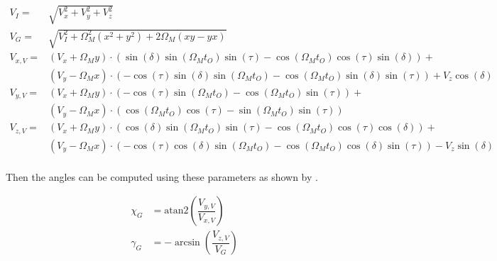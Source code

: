 \begin{equation} \label{eq:intermediateParameters}
\begin{split}
V_{I}=&\sqrt{V_{x}^{2}+V_{y}^{2}+V_{z}^{2}}\\
V_{G}=&\sqrt{V_{I}^{2}+\Omega_{M}^{2}\left(x^{2}+y^{2}\right)+2\Omega_{M}\left(xy-yx\right)}\\
V_{x,V}=&\left(V_{x}+\Omega_{M}y\right)\cdot \left(\sin\left(\delta\right)\sin\left(\Omega_{M}t_{O}\right)\sin\left(\tau\right)-\cos\left(\Omega_{M}t_{O}\right)\cos\left(\tau\right)\sin\left(\delta	\right)\right)+\\
&\left(V_{y}-\Omega_{M}x\right)\cdot \left(-\cos\left(\tau\right)\sin\left(\delta\right)\sin\left(\Omega_{M}t_{O}\right)-\cos\left(\Omega_{M}t_{O}\right)\sin\left(\delta\right)\sin\left(\tau\right)\right)+V_{z}\cos\left(\delta\right)\\
V_{y,V}=&\left(V_{x}+\Omega_{M}y\right)\cdot \left(-\cos\left(\tau\right)\sin\left(\Omega_{M}t_{O}\right)-\cos\left(\Omega_{M}t_{O}\right)\sin\left(\tau\right)\right)+\\
&\left(V_{y}-\Omega_{M}x\right)\cdot \left(\cos\left(\Omega_{M}t_{O}\right)\cos\left(\tau\right)-\sin\left(\Omega_{M}t_{O}\right)\sin\left(\tau\right)\right)\\
V_{z,V}=&\left(V_{x}+\Omega_{M}y\right)\cdot \left(\cos\left(\delta\right)\sin\left(\Omega_{M}t_{O}\right)\sin\left(\tau\right)-\cos\left(\Omega_{M}t_{O}\right)\cos\left(\tau\right)\cos\left(\delta	\right)\right)+\\
&\left(V_{y}-\Omega_{M}x\right)\cdot \left(-\cos\left(\tau\right)\cos\left(\delta\right)\sin\left(\Omega_{M}t_{O}\right)-\cos\left(\Omega_{M}t_{O}\right)\cos\left(\delta\right)\sin\left(\tau\right)\right)-V_{z}\sin\left(\delta\right)\\
\end{split}
\end{equation}

\noindent
Then the angles can be computed using these parameters as shown by .


\begin{equation} \label{eq:fpaAndazimuth}
\begin{split}
\chi_{G}&=\text{atan2}\left(\dfrac{V_{y,V}}{V_{x,V}}\right)\\
\gamma_{G}&=-\arcsin\left(\dfrac{V_{z,V}}{V_{G}}\right)\\
\end{split}
\end{equation}

